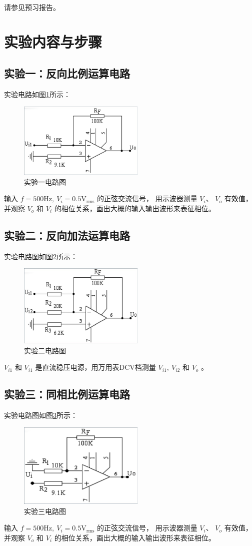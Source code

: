 \documentclass[a4paper,11pt,UTF8]{ctexart}
\newcommand\mr[1]{\mathrm{#1}}
\begin{document}
请参见预习报告。

\section{实验内容与步骤}
\subsection{实验一：反向比例运算电路}
 实验电路如图\ref{fig:Exp01}所示：
 \begin{figure}[H]
  \centering
  \includegraphics[width=6cm]{Exp01Circ}
  \caption{实验一电路图}
  \label{fig:Exp01}
 \end{figure}
 输入 $f=500\mr{Hz},~V_i=0.5\mr{V_{rms}}$ 的正弦交流信号，
用示波器测量 $V_i$、 $V_o$ 有效值，并观察 $V_o$ 和 $V_i$ 的相位关系，画出大概的输入输出波形来表征相位。
\subsection{实验二：反向加法运算电路}
 实验电路图如图\ref{fig:Exp02}所示：
 \begin{figure}[H]
  \centering
  \includegraphics[width=6cm]{Exp02Circ}
  \caption{实验二电路图}
  \label{fig:Exp02}
 \end{figure}
 $V_{i1}$ 和 $V_{i1}$ 是直流稳压电源，用万用表DCV档测量 $V_{i1},~V_{i2}$ 和 $V_o$ 。
 \subsection{实验三：同相比例运算电路}
 实验电路图如图\ref{fig:Exp03}所示：
 \begin{figure}[H]
  \centering
  \includegraphics[width=6cm]{Exp03Circ}
  \caption{实验三电路图}
  \label{fig:Exp03}
 \end{figure}
 输入 $f=500\mr{Hz},~V_i=0.5\mr{V_{rms}}$ 的正弦交流信号，
用示波器测量 $V_i$、 $V_o$ 有效值，并观察 $V_o$ 和 $V_i$ 的相位关系，画出大概的输入输出波形来表征相位。
\end{document}
